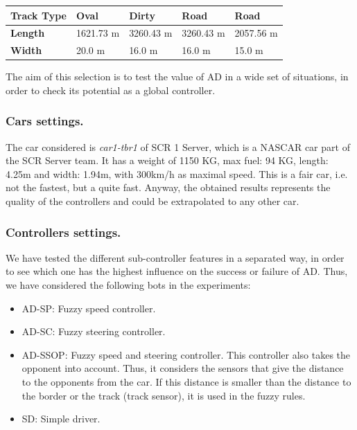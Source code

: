 \documentclass[runningheads,a4paper]{llncs}
\begin{document}
\begin{table}
\begin{tabular}{ |p{2cm}|p{1.9 cm}|p{2.2 cm}|p{2.1 cm}|p{2.2 cm}|}
			\\
			\hline
			\textbf{Track Type}   
			& Oval
			& Dirty
			& Road
			& Road
			
			\\
			\hline
			
			\textbf{Length}   
			& 1621.73 m
			& 3260.43 m
			& 3260.43 m
			& 2057.56 m
			
			\\
			\hline
			\textbf{Width}   
			& 20.0 m
			& 16.0 m
			& 16.0 m
			& 15.0 m
			\\
			\hline
		\end{tabular} 
		
	\end{table}
	
	The aim of this selection is to test the value of AD in a wide set of situations, in order to check its potential as a global controller.
	
	
	
	\subsubsection{Cars settings.}
	
	The car considered is \textit{car1-tbr1} of SCR 1 Server, which is a NASCAR car part of the SCR Server team. It has a weight of 1150 KG, max fuel: 94 KG, length: 4.25m and width: 1.94m, with 300km/h as maximal speed.
	This is a fair car, i.e. not the fastest, but a quite fast. Anyway, the obtained results represents the quality of the controllers and could be extrapolated to any other car.
	
	
	\subsubsection{Controllers settings.}
	
	We have tested the different sub-controller features in a separated way, in order to see which one has the highest influence on the success or failure of
	AD. Thus, we have considered the following bots in the experiments:
	
	\begin{itemize}
		\item AD-SP: Fuzzy speed controller. 
		\item AD-SC: Fuzzy steering controller.
		\item AD-SSOP: Fuzzy speed and steering controller.
		This controller also takes the opponent into account. Thus, it considers the sensors that give the distance to the opponents from the car. If this distance is smaller than the distance to the border or the track (track sensor), it is used in the fuzzy rules.
		\item SD: Simple driver.
	\end{itemize}
	
\end{document}
